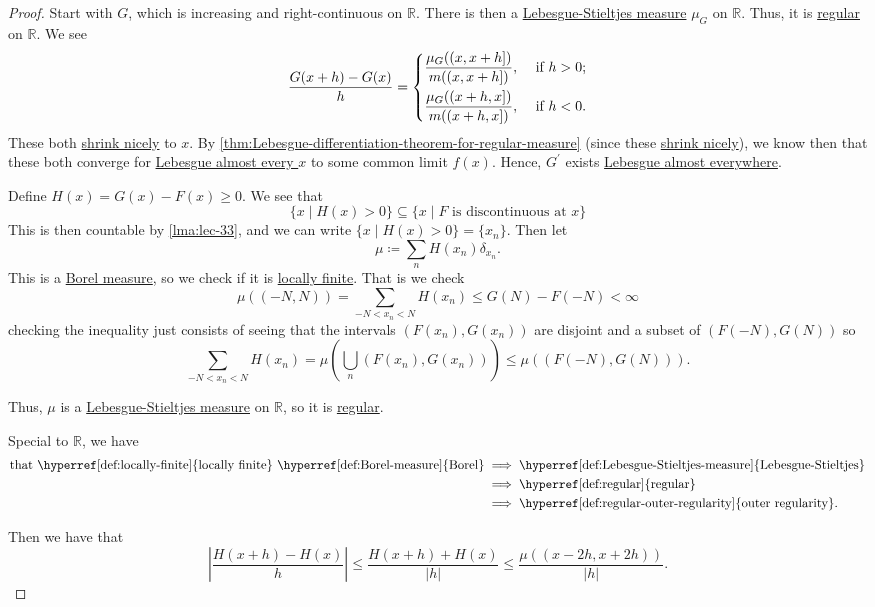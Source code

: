 \begin{proof}
	Start with \(G\), which is increasing and right-continuous on \(\mathbb{R}\). There is then a \hyperref[def:Lebesgue-Stieltjes-measure]{Lebesgue-Stieltjes measure}
	\(\mu_G\) on \(\mathbb{R}\). Thus, it is \hyperref[def:regular]{regular} on \(\mathbb{R}\). We see
	\[
		\frac{G(x+h) - G(x)}{h} = \begin{dcases}
			\frac{\mu _{G} ((x, x+h])}{m((x, x+h])}, & \text{ if } h>0 ; \\
			\frac{\mu _{G} ((x+h, x])}{m((x+h, x])}, & \text{ if } h<0 .
		\end{dcases}
	\]
	These both \hyperref[def:shrink-nicely]{shrink nicely} to \(x\). By \autoref{thm:Lebesgue-differentiation-theorem-for-regular-measure} (since
	these \hyperref[def:shrink-nicely]{shrink nicely}), we know then that these both converge for \hyperref[def:mu-almost-everywhere]{Lebesgue almost every \(x\)}
	to some common limit \(f(x)\). Hence, \(G^\prime\) exists \hyperref[def:mu-almost-everywhere]{Lebesgue almost everywhere}.

	Define \(H(x) = G(x) - F(x) \geq 0\). We see that
	\[
		\{x \mid H(x) > 0\} \subseteq \{x \mid F \text{ is discontinuous at } x\}
	\]
	This is then countable by \autoref{lma:lec-33}, and we can write \(\{x \mid H(x) > 0\} = \{x_n\}\). Then let
	\[
		\mu \coloneqq \sum_n H(x_n) \delta_{x_n}.
	\]
	This is a \hyperref[def:Borel-measure]{Borel measure}, so we check if it is \hyperref[def:locally-finite]{locally finite}. That is we check
	\[
		\mu((-N,N)) = \sum_{-N < x_n < N} H(x_n) \leq G(N) - F(-N) < \infty
	\]
	checking the inequality just consists of seeing that the intervals \((F(x_n),G(x_n))\) are disjoint and a subset of \((F(-N),G(N))\) so
	\[
		\sum_{-N < x_n < N} H(x_n) = \mu\left( \bigcup_n (F(x_n), G(x_n)) \right) \leq \mu((F(-N),G(N))).
	\]

	Thus, \(\mu\) is a \hyperref[def:Lebesgue-Stieltjes-measure]{Lebesgue-Stieltjes measure} on \(\mathbb{R}\), so it is \hyperref[def:regular]{regular}.
	\begin{remark}
		Special to \(\mathbb{R}\), we have
		\[
			\begin{split}
				\text{that \hyperref[def:locally-finite]{locally finite} \hyperref[def:Borel-measure]{Borel}}
				&\implies \text{\hyperref[def:Lebesgue-Stieltjes-measure]{Lebesgue-Stieltjes}}\\
				&\implies \text{\hyperref[def:regular]{regular}}\\
				&\implies \text{\hyperref[def:regular-outer-regularity]{outer regularity}}.
			\end{split}
		\]
	\end{remark}
	Then we have that
	\[
		\left\vert \frac{H(x + h) - H(x)}{h} \right\vert \leq \frac{H(x + h) + H(x)}{\left\vert h \right\vert} \leq \frac{\mu((x-2h,x+2h))}{\left\vert h \right\vert}.
	\]


\end{proof}
